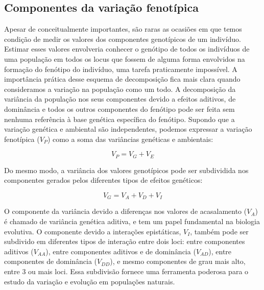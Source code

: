 \begin{refsection}
\subsection{Componentes da variação fenotípica}

Apesar de conceitualmente importantes, são raras as ocasiões em que temos
condição de medir os valores dos componentes genotípicos de um indivíduo. Estimar
esses valores envolveria conhecer o genótipo de todos os indivíduos de uma
população em todos os locus que fossem de alguma forma envolvidos na formação
do fenótipo do indivíduo, uma tarefa praticamente impossível. A importância
prática desse esquema de decomposição fica mais clara quando consideramos a
variação na população como um todo. A decomposição da variância da população nos
seus componentes devido a efeitos aditivos, de dominância e todos os outros
componentes do fenótipo pode ser feita sem nenhuma referência à base genética
específica do fenótipo. Supondo que a variação genética e ambiental são
independentes, podemos expressar a variação fenotípica ($V_P$) como a soma das
variâncias genéticas e ambientais:

\begin{equation}
V_P = V_G + V_E
\end{equation}

Do mesmo modo, a variância dos valores genotípicos pode ser subdividida nos
componentes gerados pelos diferentes tipos de efeitos genéticos:

\begin{equation}
V_G = V_A + V_D + V_I
\end{equation}

O componente da variância devido a diferenças nos valores de acasalamento
($V_A$) é chamado de variância genética aditiva, e tem um papel fundamental na
biologia evolutiva. O componente devido a interações epistáticas, $V_I$,
também pode ser subdivido em diferentes tipos de interação entre dois loci:
entre componentes aditivos ($V_{AA}$), entre componentes aditivos e de
dominância ($V_{AD}$), entre componentes de dominância ($V_{DD}$), e mesmo
componentes de grau mais alto, entre 3 ou mais loci. Essa subdivisão fornece
uma ferramenta poderosa para o estudo da variação e evolução em populações
naturais.


\end{refsection}
